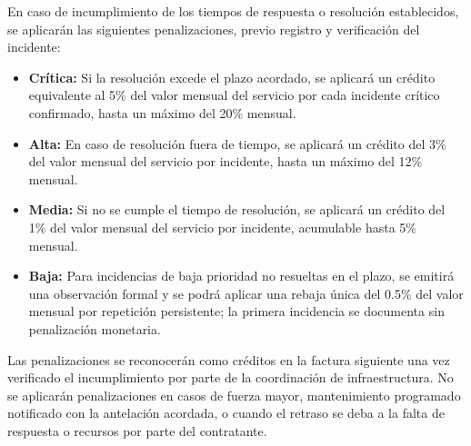 En caso de incumplimiento de los tiempos de respuesta o resolución establecidos, se aplicarán las siguientes penalizaciones, previo registro y verificación del incidente:
\begin{itemize}
    \item \textbf{Crítica:} Si la resolución excede el plazo acordado, se aplicará un crédito equivalente al 5\% del valor mensual del servicio por cada incidente crítico confirmado, hasta un máximo del 20\% mensual.
    \item \textbf{Alta:} En caso de resolución fuera de tiempo, se aplicará un crédito del 3\% del valor mensual del servicio por incidente, hasta un máximo del 12\% mensual.
    \item \textbf{Media:} Si no se cumple el tiempo de resolución, se aplicará un crédito del 1\% del valor mensual del servicio por incidente, acumulable hasta 5\% mensual.
    \item \textbf{Baja:} Para incidencias de baja prioridad no resueltas en el plazo, se emitirá una observación formal y se podrá aplicar una rebaja única del 0.5\% del valor mensual por repetición persistente; la primera incidencia se documenta sin penalización monetaria.
\end{itemize}

Las penalizaciones se reconocerán como créditos en la factura siguiente una vez verificado el incumplimiento por parte de la coordinación de infraestructura. No se aplicarán penalizaciones en casos de fuerza mayor, mantenimiento programado notificado con la antelación acordada, o cuando el retraso se deba a la falta de respuesta o recursos por parte del contratante.

